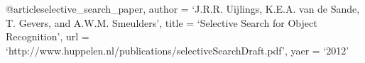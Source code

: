 @article{selective_search_paper,
    author = `J.R.R. Uijlings, K.E.A. van de Sande, T. Gevers, and A.W.M. Smeulders',
    title = `Selective Search for Object Recognition',
    url = `http://www.huppelen.nl/publications/selectiveSearchDraft.pdf',
    yaer = `2012'
}

